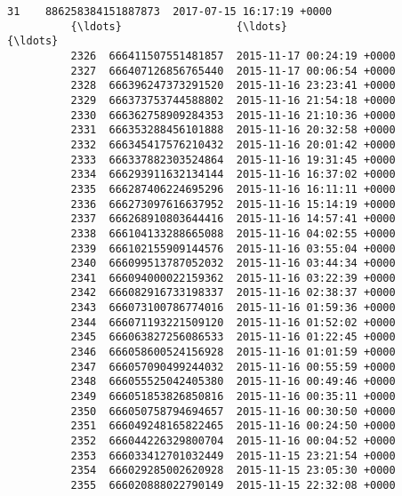 \documentclass[11pt]{article}
\begin{document}
\begin{Verbatim}[commandchars=\\\{\}]
          31    886258384151887873  2017-07-15 16:17:19 +0000   
          {\ldots}                  {\ldots}                        {\ldots}   
          2326  666411507551481857  2015-11-17 00:24:19 +0000   
          2327  666407126856765440  2015-11-17 00:06:54 +0000   
          2328  666396247373291520  2015-11-16 23:23:41 +0000   
          2329  666373753744588802  2015-11-16 21:54:18 +0000   
          2330  666362758909284353  2015-11-16 21:10:36 +0000   
          2331  666353288456101888  2015-11-16 20:32:58 +0000   
          2332  666345417576210432  2015-11-16 20:01:42 +0000   
          2333  666337882303524864  2015-11-16 19:31:45 +0000   
          2334  666293911632134144  2015-11-16 16:37:02 +0000   
          2335  666287406224695296  2015-11-16 16:11:11 +0000   
          2336  666273097616637952  2015-11-16 15:14:19 +0000   
          2337  666268910803644416  2015-11-16 14:57:41 +0000   
          2338  666104133288665088  2015-11-16 04:02:55 +0000   
          2339  666102155909144576  2015-11-16 03:55:04 +0000   
          2340  666099513787052032  2015-11-16 03:44:34 +0000   
          2341  666094000022159362  2015-11-16 03:22:39 +0000   
          2342  666082916733198337  2015-11-16 02:38:37 +0000   
          2343  666073100786774016  2015-11-16 01:59:36 +0000   
          2344  666071193221509120  2015-11-16 01:52:02 +0000   
          2345  666063827256086533  2015-11-16 01:22:45 +0000   
          2346  666058600524156928  2015-11-16 01:01:59 +0000   
          2347  666057090499244032  2015-11-16 00:55:59 +0000   
          2348  666055525042405380  2015-11-16 00:49:46 +0000   
          2349  666051853826850816  2015-11-16 00:35:11 +0000   
          2350  666050758794694657  2015-11-16 00:30:50 +0000   
          2351  666049248165822465  2015-11-16 00:24:50 +0000   
          2352  666044226329800704  2015-11-16 00:04:52 +0000   
          2353  666033412701032449  2015-11-15 23:21:54 +0000   
          2354  666029285002620928  2015-11-15 23:05:30 +0000   
          2355  666020888022790149  2015-11-15 22:32:08 +0000   
          

\end{Verbatim}
\end{document}

